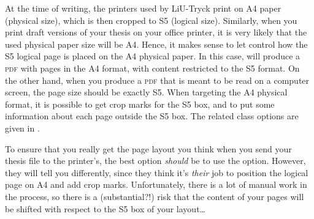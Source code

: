At the time of writing, the printers used by LiU-Tryck print on A4 paper (physical size), which is then cropped to S5 (logical size).  Similarly, when you print draft versions of your thesis on your office printer, it is very likely that the used physical paper size will be A4.  Hence, it makes sense to let \rtthesis control how the S5 logical page is placed on the A4 physical paper.  In this case, \rtthesis will produce a \textsc{pdf} with pages in the A4 format, with content restricted to the S5 format.  On the other hand, when you produce a \textsc{pdf} that is meant to be read on a computer screen, the page size should be exactly S5.  When targeting the A4 physical format, it is possible to get crop marks for the S5 box, and to put some information about each page outside the S5 box.  The related class options are given in .

To ensure that you really get the page layout you think when you send your thesis file to the printer's, the best option \emph{should} be to use the  option.  However, they will tell you differently, since they think it's \emph{their} job to position the logical page on A4 and add crop marks.  Unfortunately, there is a lot of manual work in the process, so there is a (substantial?!) risk that the content of your pages will be shifted with respect to the S5 box of your layout\ldots

